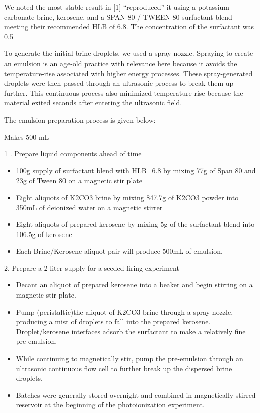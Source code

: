 We noted the most stable result in ​[1]​ “reproduced” it using a potassium carbonate brine, kerosene, and a SPAN 80 / TWEEN 80 surfactant blend meeting their recommended HLB of 6.8. The concentration of the surfactant was 0.5%

To generate the initial brine droplets, we used a spray nozzle. Spraying to create an emulsion is an age-old practice \cite{atkinsonKeroseneEmulsionHow1890} with relevance here because it avoids the temperature-rise associated with higher energy processes. These spray-generated droplets were then passed through an ultrasonic process to break them up further. This continuous process also minimized temperature rise because the material exited seconds after entering the ultrasonic field. 

The emulsion preparation process is given below:

Makes 500 mL 

1 . Prepare liquid components ahead of time 
\begin{itemize}
\item 100g supply of surfactant blend with HLB=6.8 by mixing 77g of Span 80 and 23g of Tween 80 on a magnetic stir plate 

\item Eight aliquots of K2CO3 brine by mixing 847.7g of K2CO3 powder into 350mL of deionized water on a magnetic stirrer 

\item Eight aliquots of prepared kerosene by mixing 5g of the surfactant blend into 106.5g of kerosene  

\item Each Brine/Kerosene aliquot pair will produce 500mL of emulsion. 
\end{itemize}


2. Prepare a 2-liter supply for a seeded firing experiment 

\begin{itemize}
    
\item Decant an aliquot of prepared kerosene into a beaker and begin stirring on a magnetic stir plate. 

\item Pump (peristaltic)the aliquot of K2CO3 brine through a spray nozzle, producing a mist of droplets to fall into the prepared kerosene. Droplet/kerosene interfaces adsorb the surfactant to make a relatively fine pre-emulsion. 

\item While continuing to magnetically stir, pump the pre-emulsion through an ultrasonic continuous flow cell to further break up the dispersed brine droplets. 

\item Batches were generally stored overnight and combined in magnetically stirred reservoir at the beginning of the photoionization experiment. 
\end{itemize}



